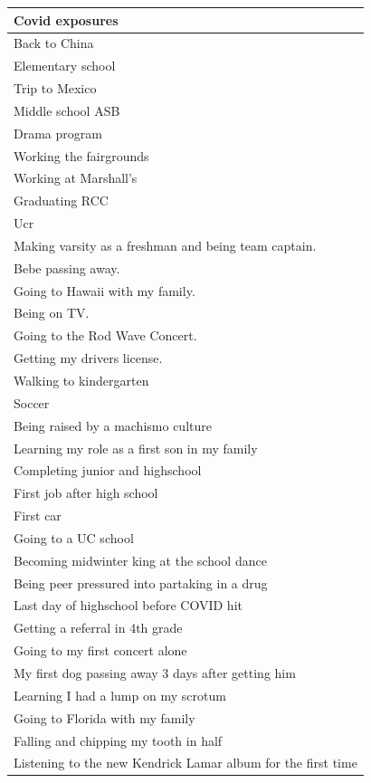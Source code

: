\documentclass[
  .7em,
  letterpaper,
  DIV=11,
  numbers=noendperiod]{scrartcl}
\begin{document}
\begin{table}
\begin{tabular}{l}
\hline
Covid exposures\\
\hline
Back to China\\
\hline
Elementary school\\
\hline
Trip to Mexico\\
\hline
Middle school ASB\\
\hline
Drama program\\
\hline
Working the fairgrounds\\
\hline
Working at Marshall’s\\
\hline
Graduating RCC\\
\hline
Ucr\\
\hline
Making varsity as a freshman and being team captain.\\
\hline
Bebe passing away.\\
\hline
Going to Hawaii with my family.\\
\hline
Being on TV.\\
\hline
Going to the Rod Wave Concert.\\
\hline
Getting my drivers license.\\
\hline
Walking to kindergarten\\
\hline
Soccer\\
\hline
Being raised by a machismo culture\\
\hline
Learning my role as a first son in my family\\
\hline
Completing junior and highschool\\
\hline
First job after high school\\
\hline
First car\\
\hline
Going to a UC school\\
\hline
Becoming midwinter king at the school dance\\
\hline
Being peer pressured into partaking in a drug\\
\hline
Last day of highschool before COVID hit\\
\hline
Getting a referral in 4th grade\\
\hline
Going to my first concert alone\\
\hline
My first dog passing away 3 days after getting him\\
\hline
Learning I had a lump on my scrotum\\
\hline
Going to Florida with my family\\
\hline
Falling and chipping my tooth in half\\
\hline
Listening to the new Kendrick Lamar album for the first time\\

\end{tabular}
\end{table}
\end{document}
